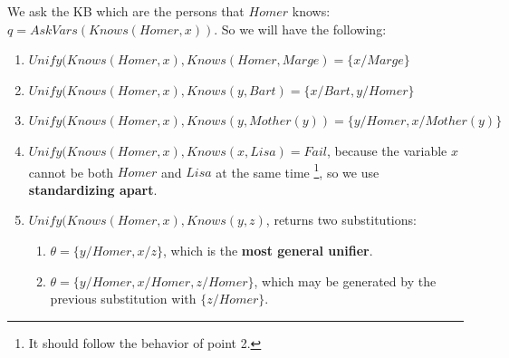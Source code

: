 \documentclass[10pt,a4paper]{article}
\begin{document}
We ask the KB which are the persons that $Homer$ knows: $q=AskVars(Knows( Homer,x))$. So we will have the following:
\begin{enumerate}
\item $Unify(Knows( Homer,x),Knows(Homer, Marge)=\lbrace x/Marge \rbrace$
\item $Unify(Knows( Homer,x),Knows(y, Bart)=\lbrace x/Bart, y/Homer \rbrace$
\item $Unify(Knows( Homer,x),Knows(y, Mother(y))=\lbrace y/Homer, x/Mother(y) \rbrace$
\item $Unify(Knows( Homer,x),Knows(x, Lisa)=Fail$, because the variable $x$ cannot be both $Homer$ and $Lisa$ at the same time \footnote{It should follow the behavior of point 2.}, so we use \textbf{standardizing apart}.
\item $Unify(Knows( Homer,x),Knows(y, z)$, returns two substitutions:
	\begin{enumerate}
	\item $\theta=\lbrace y/Homer, x/z \rbrace$, which is the \textbf{most general unifier}.
	\item $\theta=\lbrace y/Homer, x/Homer, z/Homer \rbrace$, which may be generated by the previous substitution with $\lbrace z/Homer \rbrace$.
	\end{enumerate}
\end{enumerate}
\end{document}
